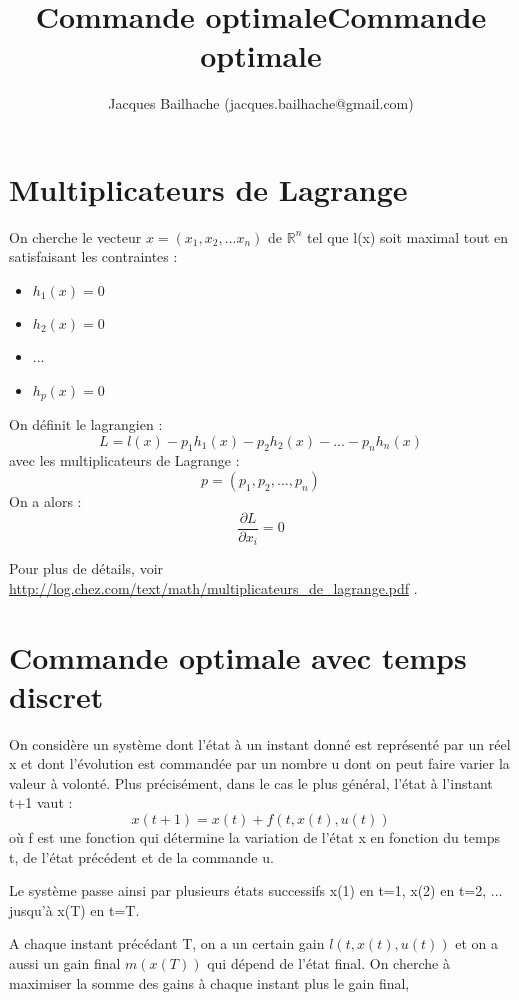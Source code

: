 \documentclass[10pt]{article}
\title{Commande optimale}
\begin{document}
\title{Commande optimale}
\author{Jacques Bailhache (jacques.bailhache@gmail.com)}

\maketitle

\setlength{\parindent}{0pt}

\section{Multiplicateurs de Lagrange}

On cherche le vecteur \( x = (x_1, x_2, ... x_n) \) de \( \mathbb{R}^n \) tel que l(x) soit maximal tout en satisfaisant les contraintes :
\begin{itemize}
     \setlength{\itemsep}{1pt}
     \setlength{\parskip}{0pt}
     \setlength{\parsep}{0pt}
\item \( h_1(x) = 0 \)
\item \( h_2(x) = 0 \)
\item ...
\item \( h_p(x) = 0 \)
\end{itemize}

On définit le lagrangien : 
\[ L = l(x) - p_1 h_1(x) - p_2 h_2(x) - ... - p_n h_n(x) \]
avec les multiplicateurs de Lagrange :
\[ p = (p_1, p_2, ... , p_n) \]
On a alors :
\[ \frac{\partial L}{\partial x_i} = 0 \]

Pour plus de détails, voir \url{http://log.chez.com/text/math/multiplicateurs_de_lagrange.pdf} .

\section{Commande optimale avec temps discret}

On considère un système dont l'état à un instant donné est représenté par un réel x et dont l'évolution est commandée par un nombre u dont on peut faire varier la valeur à volonté. Plus précisément, dans le cas le plus général, l'état à l'instant t+1 vaut :
\[ x(t+1) = x(t) + f(t,x(t),u(t)) \]
où f est une fonction qui détermine la variation de l'état x en fonction du temps t, de l'état précédent et de la commande u.

Le système passe ainsi par plusieurs états successifs x(1) en t=1, x(2) en t=2, ... jusqu'à x(T) en t=T.

A chaque instant précédant T, on a un certain gain \( l(t,x(t),u(t)) \) et on a aussi un gain final \( m(x(T)) \) qui dépend de l'état final.
On cherche à maximiser la somme des gains à chaque instant plus le gain final, 
\end{document}
